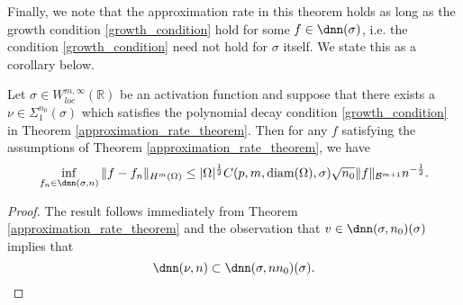  Finally, we note that the approximation rate in this theorem holds as long as the growth condition \eqref{growth_condition}
 hold for some $f\in \dnn(\sigma)$, i.e. the condition \eqref{growth_condition} need not hold for $\sigma$ itself.
 We state this as a corollary below.
 \begin{corollary}\label{GeneralApproximation}
  Let $\sigma\in W^{m,\infty}_{loc}(\mathbb{R})$ be an activation function and suppose that there exists a $\nu\in \Sigma_1^{n_0}(\sigma)$ which satisfies the polynomial decay condition \eqref{growth_condition} in Theorem \ref{approximation_rate_theorem}. Then for any $f$ satisfying the assumptions of Theorem \ref{approximation_rate_theorem}, we have
  \begin{equation}
     \inf_{f_n\in \dnn(\sigma,n)}\|f - f_n\|_{H^m(\Omega)} \leq |\Omega|^{\frac{1}{2}}C(p,m,\text{\normalfont diam}(\Omega),\sigma)\sqrt{n_0}\|f\|_{\mathcal{B}^{m+1}}n^{-\frac{1}{2}}.
  \end{equation}

 \end{corollary}
 \begin{proof}
 The result follows immediately from Theorem \ref{approximation_rate_theorem} and the observation that $v\in \dnn(\sigma,n_0)(\sigma)$ implies that
 \begin{equation}
  \dnn(\nu,n) \subset \dnn(\sigma,nn_0)(\sigma).
 \end{equation}

 \end{proof}

